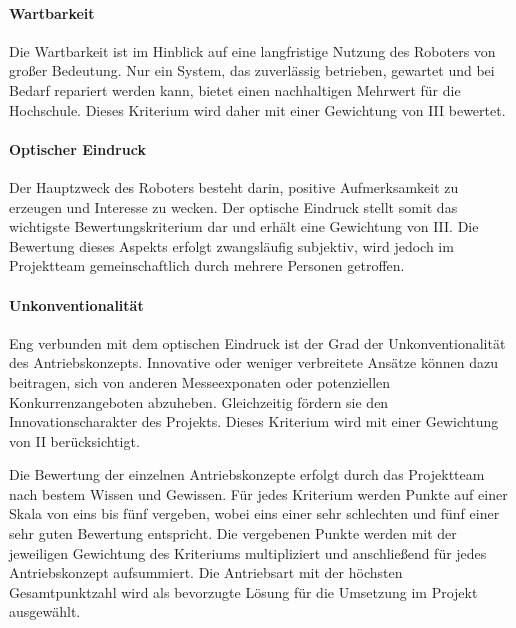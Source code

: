 \paragraph{Wartbarkeit}
Die Wartbarkeit ist im Hinblick auf eine langfristige Nutzung des Roboters von großer Bedeutung. Nur ein System, das zuverlässig betrieben, gewartet und bei Bedarf repariert werden kann, bietet einen nachhaltigen Mehrwert für die Hochschule. Dieses Kriterium wird daher mit einer Gewichtung von III bewertet.

\paragraph{Optischer Eindruck}
Der Hauptzweck des Roboters besteht darin, positive Aufmerksamkeit zu erzeugen und Interesse zu wecken. Der optische Eindruck stellt somit das wichtigste Bewertungskriterium dar und erhält eine Gewichtung von III. Die Bewertung dieses Aspekts erfolgt zwangsläufig subjektiv, wird jedoch im Projektteam gemeinschaftlich durch mehrere Personen getroffen.

\paragraph{Unkonventionalität}
Eng verbunden mit dem optischen Eindruck ist der Grad der Unkonventionalität des Antriebskonzepts. Innovative oder weniger verbreitete Ansätze können dazu beitragen, sich von anderen Messeexponaten oder potenziellen Konkurrenzangeboten abzuheben. Gleichzeitig fördern sie den Innovationscharakter des Projekts. Dieses Kriterium wird mit einer Gewichtung von II berücksichtigt.

\begin{table}[H]
	\centering
	
	\caption{Trade-off-Analyse der betrachteten Antriebskonzepte}		
	\label{tab:tradeoff_Antriebsart}
\end{table}

Die Bewertung der einzelnen Antriebskonzepte erfolgt durch das Projektteam nach bestem Wissen und Gewissen. Für jedes Kriterium werden Punkte auf einer Skala von eins bis fünf vergeben, wobei eins einer sehr schlechten und fünf einer sehr guten Bewertung entspricht. Die vergebenen Punkte werden mit der jeweiligen Gewichtung des Kriteriums multipliziert und anschließend für jedes Antriebskonzept aufsummiert. Die Antriebsart mit der höchsten Gesamtpunktzahl wird als bevorzugte Lösung für die Umsetzung im Projekt ausgewählt.


